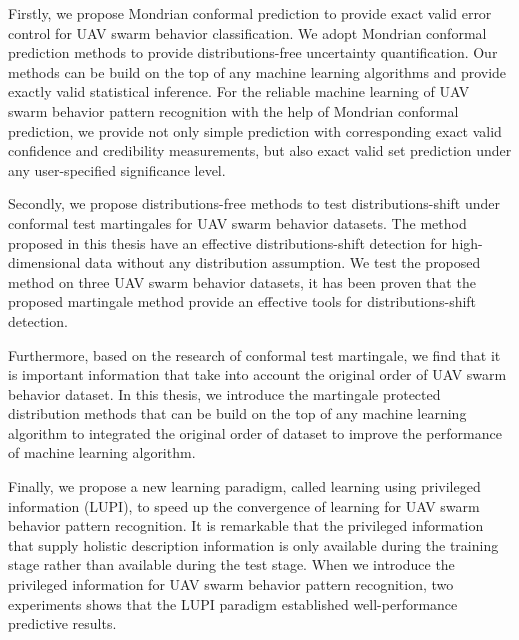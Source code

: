 Firstly, we propose Mondrian conformal prediction to provide exact valid error control for UAV swarm behavior classification. We adopt Mondrian conformal prediction methods to provide distributions-free uncertainty quantification. Our methods can be build on the top of any machine learning algorithms and provide exactly valid statistical inference. For the reliable machine learning of UAV swarm behavior pattern recognition with the help of Mondrian conformal prediction, we provide not only simple prediction with corresponding exact valid confidence and credibility measurements, but also exact valid set prediction under any user-specified significance level.

Secondly, we propose distributions-free methods to test distributions-shift under conformal test martingales for UAV swarm behavior datasets. The method proposed in this thesis have an effective distributions-shift detection for high-dimensional data without any distribution assumption. We test the proposed method on  three UAV swarm behavior datasets, it has been proven that the proposed martingale method provide an effective tools for distributions-shift detection.

Furthermore, based on the research of conformal test martingale, we find that it is important information that take into account the original order of UAV swarm behavior dataset. In this thesis, we introduce the martingale protected distribution methods that can be build on the top of any machine learning algorithm to integrated the original order of dataset to improve the performance of machine learning algorithm. 

Finally, we propose a new learning paradigm, called learning using privileged information (LUPI), to speed up the convergence of learning for UAV swarm behavior pattern recognition. It is remarkable that the privileged information that supply holistic description information is only available during the training stage rather than available during the test stage. When we introduce the privileged information for UAV swarm behavior pattern recognition, two experiments shows that the LUPI paradigm established well-performance predictive results.


